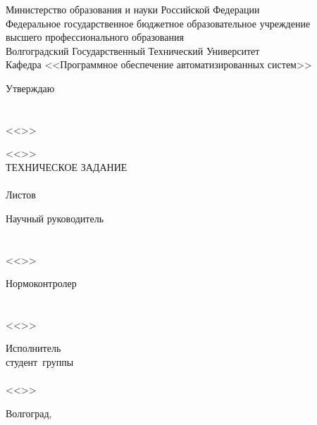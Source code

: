 {{
\sloppy
\clearpage
\thispagestyle{empty}
\begin{center}
Министерство образования и науки Российской Федерации\\
Федеральное государственное бюджетное образовательное учреждение\\
высшего профессионального образования\\
Волгоградский Государственный Технический Университет\\
Кафедра <<Программное обеспечение автоматизированных систем>>\\
\end{center}
\vfill
\hfill
\begin{minipage}[c]{18em}
Утверждаю\\
\VSTUHeadOfDepartmentPost\\
\makebox[2cm]{\hrulefill}\VSTUHeadOfDepartmentDegree~\VSTUHeadOfDepartmentName\\
<<\makebox[1.5cm]{\hrulefill}>>\makebox[3.5cm]{\hrulefill}\the\year
\end{minipage}
\vspace{8mm}
\begin{center}
<<\VSTUTitle>>\\
\vspace{\fill}
ТЕХНИЧЕСКОЕ ЗАДАНИЕ\\
\vspace{8mm}
\VSTUDocumentCode{}\\
\vspace{8mm}
Листов \totalpages\\
\vspace{15mm}
\end{center}
\begin{flushright}
\begin{minipage}[c]{15em}
Научный руководитель\\
\VSTUDirectorDegree{}\\
\makebox[2cm]{\hrulefill}\VSTUDirectorName\\
<<\makebox[1.5cm]{\hrulefill}>>\makebox[3.5cm]{\hrulefill}\the\year
\end{minipage}
\end{flushright}
\vspace{8mm}

\begin{flushleft}
\begin{minipage}[c]{15em}
Нормоконтролер\\
\VSTUStandardsAdviserDegree\\
\makebox[2cm]{\hrulefill}\VSTUStandardsAdviserName\\
<<\makebox[1.5cm]{\hrulefill}>>\makebox[3.5cm]{\hrulefill}\the\year
\end{minipage}
\hfill
\begin{minipage}[c]{15em}
Исполнитель\\
студент\ группы\ \VSTUStudentGroup\\
\makebox[2cm]{\hrulefill}\VSTUStudentName\\
<<\makebox[1.5cm]{\hrulefill}>>\makebox[3.5cm]{\hrulefill}\the\year
\end{minipage}
\end{flushleft}

\vspace{\fill}
\begin{center}
Волгоград,\ \the\year
\end{center}
}
}
